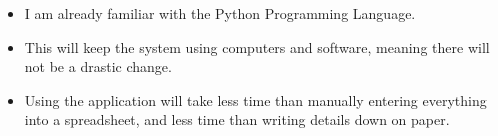 \begin{itemize}
    \item I am already familiar with the Python Programming Language.
    \item This will keep the system using computers and software, meaning there will not be a drastic change.
    \item Using the application will take less time than manually entering everything into a spreadsheet, and less time than writing details down on paper.
\end{itemize}
